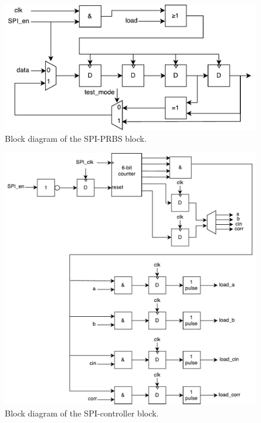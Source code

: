 \begin{figure}[H]
	\centering
	\captionsetup{justification=centering}
	\includegraphics[scale=0.5]{../figures/SPI_PRBS_2.pdf}
	\caption{Block diagram of the SPI-PRBS block.} \label{fig:spi_prbs}
\end{figure}

\begin{figure}[H]
	\centering
	\captionsetup{justification=centering}
	\includegraphics[scale=0.5]{../figures/SPI_controller.pdf}
	\caption{Block diagram of the SPI-controller block.} \label{fig:spi_controller}
\end{figure}


